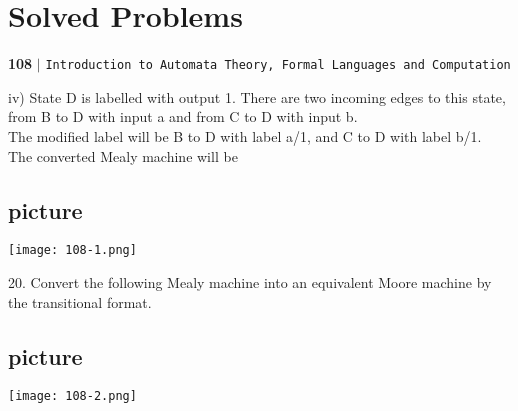 \documentclass[8pt]{beamer}
\begin{document}
\begin{frame}
\section*{Solved Problems}
\begin{flushleft}
    \textbf{108}\hspace*{0.1cm} \textbf{$|$} \hspace*{0.1cm} \texttt{Introduction to Automata Theory, Formal Languages and Computation}
  \end{flushleft}
  \vspace*{0.5cm}

iv) State D is labelled with output 1. There are two incoming edges to this state, from B to D with
input a and from C to D with input b.\\
\hspace*{0.5cm} The modified label will be B to D with label a/1, and C to D with label b/1.\\
\hspace*{0.5cm} The converted Mealy machine will be\\

\vspace*{0.3cm}
\begin{center}
\section{picture}
\texttt{[image: 108-1.png]}
\end{center}
\end{frame}

\begin{frame}
20. Convert the following Mealy machine into an equivalent Moore machine by the transitional
format.\\

\vspace*{0.3cm}
\begin{center}
\section{picture}
\texttt{[image: 108-2.png]}
\end{center}
\end{frame}
\end{document}
